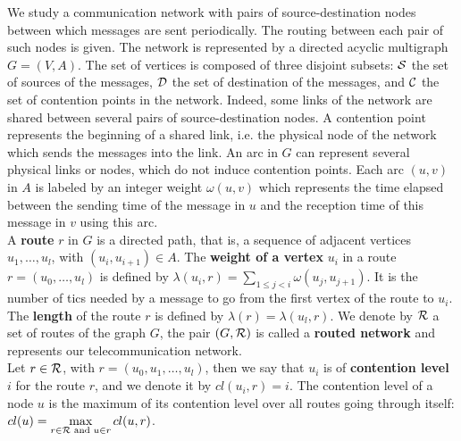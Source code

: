 \documentclass[english]{article}
\begin{document}
  We study a communication network with pairs of source-destination nodes between which messages are sent periodically. The routing between each  pair of such nodes is given. The network is represented by a directed acyclic multigraph $G=(V,A)$. The set of vertices is composed of three disjoint subsets:  ${\cal S}$ the set of sources of the messages, ${\cal D}$ the set of destination of the messages, and ${\cal C}$ the set of contention points in the network. Indeed, some links of the network are shared between several pairs of source-destination nodes. A contention point represents the beginning of a shared link, i.e. the physical node of the network which sends the messages into the link. An arc in $G$ can represent several physical links or nodes, which do not induce contention points. Each arc  $(u,v)$ in $A$ is labeled by an integer weight $\omega(u,v)$ which represents the time elapsed between the sending time of the message in $u$ and the reception time of this message in $v$ using this arc. \\
  A {\bf route} $r$ in $G$ is a directed path, that is, a sequence of adjacent vertices $u_1, \ldots , u_{l}$, with $(u_i,u_{i+1}) \in A$.  The {\bf weight of a vertex} $u_i$ in a route $r=(u_0,\dots,u_l)$ is defined by $\lambda(u_i,r)= \sum\limits_{1 \leq j <i} \omega(u_j, u_{j+1})$. It is the number of tics needed by a message to go from the first vertex of the route to $u_i$. The \textbf{length} of the route $r$ is defined by $\lambda (r)= \lambda (u_l,r)$.
	We denote by ${\cal R}$ a set of routes of the graph $G$, the pair $(G,{\cal R})$ is called a \textbf{routed network} and represents our telecommunication network.\\
	Let $r \in {\cal R}$, with $r = (u_0,u_1,\dots,u_l)$, then we say that $u_i$ is of \textbf{contention level} $i$ for the route $r$, and we denote it by $cl(u_i,r) = i$. The contention level of a node $u$ is the maximum of its contention level over all routes going through itself: 
	$cl(u) = \max\limits_{r\in{\cal R} \text{ and } u \in r} cl(u,r)$.
\end{document}
